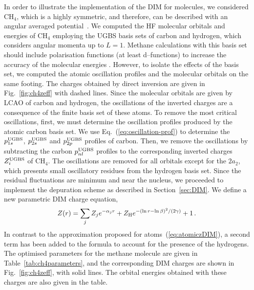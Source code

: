 \documentclass[10pt]{article}
\begin{document}
In order to illustrate the implementation of the DIM for molecules, 
we considered CH$_4$, which is a highly symmetric, and therefore, can
be described with an angular averaged potential~\cite{Granados2016}.
We computed the HF molecular orbitals and energies of CH$_4$ employing 
the UGBS basis sets of carbon and hydrogen, which considers angular momenta
up to $L=1$.
Methane calculations with this basis set should include polarisation functions
(at least d--functions) to increase the accuracy of the molecular energies
\cite{Rothenberg1971,Hariharan1972}. However, to isolate the effects of the
basis set, we computed the atomic oscillation profiles and the molecular
orbitals on the same footing. 
The charges obtained by direct inversion are given in 
Fig.~\ref{fig:ch4zeff} with dashed lines. 
Since the molecular orbitals are given by LCAO of carbon and 
hydrogen, the oscillations of the inverted charges are a 
consequence of the finite basis set of these atoms. 
To remove the most critical oscillations,  first, we must 
determine the oscillation profiles produced by the atomic carbon basis set.
We use Eq.~(\ref{eq:oscillation-prof}) to determine the 
$p_{1s}^{\mbox{\scriptsize UGBS}}$, $p_{2s}^{\mbox{\scriptsize UGBS}}$ 
and $p_{2p}^{\mbox{\scriptsize UGBS}}$ profiles of carbon. 
Then, we remove the oscillations by 
subtracting the carbon $p_{nl}^{\mbox{\scriptsize UGBS}}$ profiles 
to the corresponding inverted charges 
$Z_{i}^{\mbox{\scriptsize UGBS}}$ of CH$_4$.
The oscillations are removed for all orbitals except for the 
$2a_2$, which presents small oscillatory residues from the 
hydrogen basis set. Since the residual fluctuations are minimum
and near the nucleus, we proceeded to implement the depuration 
scheme as described in Section~\ref{sec:DIM}. We define a new 
parametric DIM charge equation,
\begin{eqnarray}
 Z(r) = \sum_j Z_j e^{-\alpha_j r} 
 + Z_{\mbox{\scriptsize H}} e^{-(\ln r - \ln \beta)^2/(2\gamma)} 
 + 1\,.
 \label{eq:moleculezDIM}
\end{eqnarray}
In contrast to the approximation proposed for 
atoms~(\ref{eq:atomiczDIM}), a second term has been added to the 
formula to account for the presence of the hydrogens.
The optimised parameters for the methane molecule are given in 
Table~\ref{tab:ch4parameters}, and the corresponding DIM 
charges are shown in Fig.~\ref{fig:ch4zeff}, with solid lines. 
The orbital energies obtained with these charges are also given in 
the table.
\end{document}
